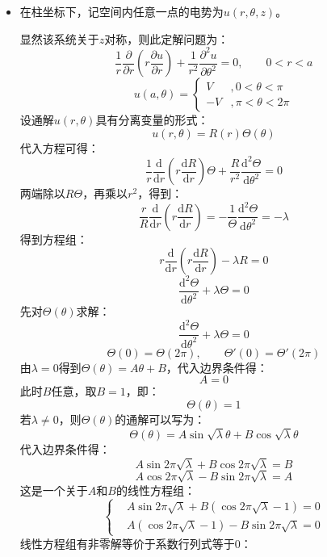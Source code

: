 \documentclass[fontset=windows]{ctexart}
\begin{document}
\begin{itemize}

    \item[1.]
    在柱坐标下，记空间内任意一点的电势为$u(r,\theta,z)$。

    显然该系统关于$z$对称，则此定解问题为：
    \[
    \frac{1}{r}\frac{\partial}{\partial r}\left(r\frac{\partial u}{\partial r}\right) + \frac{1}{r^2}\frac{\partial^2 u}{\partial\theta^2} = 0,\qquad
    0 < r < a
    \]
    \[
    u(a,\theta) =
    \left\{
    \begin{aligned}
        V &, 0 < \theta < \pi \\
        -V &, \pi < \theta < 2\pi
    \end{aligned}
    \right.
    \]
    设通解$u(r,\theta)$具有分离变量的形式：
    \[
    u(r,\theta) = R(r)\varTheta(\theta)
    \]
    代入方程可得：
    \[
    \frac{1}{r}\frac{\mathrm{d}}{\mathrm{d}r}\left(r\frac{\mathrm{d}R}{\mathrm{d} r}\right)\varTheta + \frac{R}{r^2}\frac{\mathrm{d}^2 \varTheta}{\mathrm{d}\theta^2} = 0
    \]
    两端除以${R\varTheta}$，再乘以$r^2$，得到：
    \[
    \frac{r}{R}\frac{\mathrm{d}}{\mathrm{d}r}\left(r\frac{\mathrm{d}R}{\mathrm{d} r}\right) = -\frac{1}{\varTheta}\frac{\mathrm{d}^2 \varTheta}{\mathrm{d}\theta^2} = -\lambda
    \]
    得到方程组：
    \[
    r\frac{\mathrm{d}}{\mathrm{d}r}\left(r\frac{\mathrm{d}R}{\mathrm{d} r}\right) - \lambda R = 0
    \]
    \[
    \frac{\mathrm{d}^2 \varTheta}{\mathrm{d}\theta^2} + \lambda\varTheta = 0
    \]
    先对$\varTheta(\theta)$求解：
    \[
    \frac{\mathrm{d}^2 \varTheta}{\mathrm{d}\theta^2} + \lambda\varTheta = 0
    \]
    \[
    \varTheta(0) = \varTheta(2\pi),\qquad
    \varTheta'(0) = \varTheta'(2\pi)
    \]
    由$\lambda = 0$得到$\varTheta(\theta) = A\theta + B$，代入边界条件得：
    \[
    A = 0
    \]
    此时$B$任意，取$B = 1$，即：
    \[
    \varTheta(\theta) = 1
    \]
    若$\lambda \neq 0$，则$\varTheta(\theta)$的通解可以写为：
    \[
    \varTheta(\theta) = A\sin\sqrt\lambda\theta + B\cos\sqrt\lambda\theta
    \]
    代入边界条件得：
    \[
    A\sin2\pi\sqrt{\lambda} + B\cos2\pi\sqrt{\lambda} = B
    \]
    \[
    A\cos2\pi\sqrt{\lambda} - B\sin2\pi\sqrt{\lambda} = A
    \]
    这是一个关于$A$和$B$的线性方程组：
    \[
    \left\{
    \begin{aligned}
        & A\sin2\pi\sqrt{\lambda} + B(\cos2\pi\sqrt{\lambda} - 1) = 0 \\
        & A(\cos2\pi\sqrt{\lambda} - 1) - B\sin2\pi\sqrt{\lambda} = 0
    \end{aligned}
    \right.
    \]
    线性方程组有非零解等价于系数行列式等于0：

\end{itemize}
\end{document}
